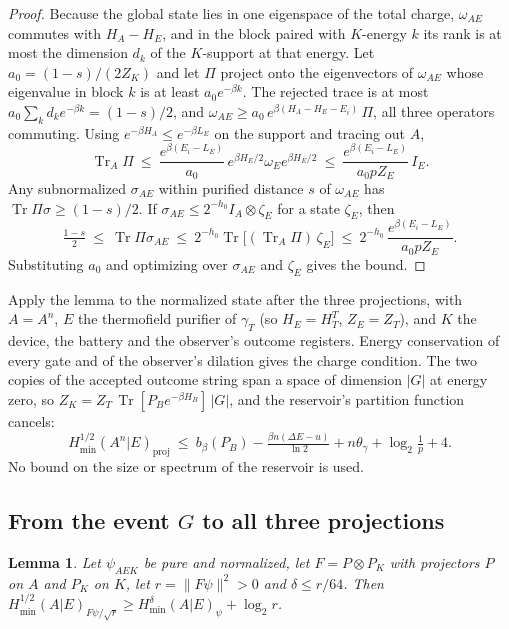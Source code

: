 \documentclass[11pt]{article}
\newtheorem{lemma}[theorem]{Lemma}
\theoremstyle{definition}
\theoremstyle{remark}
\newcommand{\Tr}{\operatorname{Tr}}
\begin{document}
\begin{proof}
Because the global state lies in one eigenspace of the total charge, $\omega_{AE}$ commutes with $H_A-H_E$, and in the block paired with $K$-energy $k$ its rank is at most the dimension $d_k$ of the $K$-support at that energy. Let $a_0=(1-s)/(2Z_K)$ and let $\Pi$ project onto the eigenvectors of $\omega_{AE}$ whose eigenvalue in block $k$ is at least $a_0e^{-\beta k}$. The rejected trace is at most $a_0\sum_kd_ke^{-\beta k}=(1-s)/2$, and $\omega_{AE}\ge a_0\,e^{\beta(H_A-H_E-E_i)}\,\Pi$, all three operators commuting. Using $e^{-\beta H_A}\le e^{-\beta L_E}$ on the support and tracing out $A$,
\[
\Tr_A\Pi\ \le\ \frac{e^{\beta(E_i-L_E)}}{a_0}\,e^{\beta H_E/2}\omega_Ee^{\beta H_E/2}\ \le\ \frac{e^{\beta(E_i-L_E)}}{a_0pZ_E}\,I_E.
\]
Any subnormalized $\sigma_{AE}$ within purified distance $s$ of $\omega_{AE}$ has $\Tr\Pi\sigma\ge(1-s)/2$. If $\sigma_{AE}\le2^{-h_0}I_A\otimes\zeta_E$ for a state $\zeta_E$, then
\[
\tfrac{1-s}2\ \le\ \Tr\Pi\sigma_{AE}\ \le\ 2^{-h_0}\Tr\bigl[(\Tr_A\Pi)\,\zeta_E\bigr]\ \le\ 2^{-h_0}\,\frac{e^{\beta(E_i-L_E)}}{a_0pZ_E}.
\]
Substituting $a_0$ and optimizing over $\sigma_{AE}$ and $\zeta_E$ gives the bound.
\end{proof}

Apply the lemma to the normalized state after the three projections, with $A=A^n$, $E$ the thermofield purifier of $\gamma_T$ (so $H_E=H_T^T$, $Z_E=Z_T$), and $K$ the device, the battery and the observer's outcome registers. Energy conservation of every gate and of the observer's dilation gives the charge condition. The two copies of the accepted outcome string span a space of dimension $|G|$ at energy zero, so $Z_K=Z_T\,\Tr[P_Be^{-\beta H_B}]\,|G|$, and the reservoir's partition function cancels:
\begin{equation}\label{eq:cap}
H^{1/2}_{\min}(A^n|E)_{\mathrm{proj}}\ \le\ b_\beta(P_B)-\tfrac{\beta n(\Delta E-u)}{\ln2}+n\theta_\gamma+\log_2\tfrac1p+4.
\end{equation}
No bound on the size or spectrum of the reservoir is used.

\subsection{\texorpdfstring{From the event $G$ to all three projections}{From the event G to all three projections}}

\begin{lemma}\label{lem:postproj}
Let $\psi_{AEK}$ be pure and normalized, let $F=P\otimes P_K$ with projectors $P$ on $A$ and $P_K$ on $K$, let $r=\|F\psi\|^2>0$ and $\delta\le r/64$. Then $H^{1/2}_{\min}(A|E)_{F\psi/\sqrt r}\ge H^{\delta}_{\min}(A|E)_\psi+\log_2r$.
\end{lemma}
\end{document}

